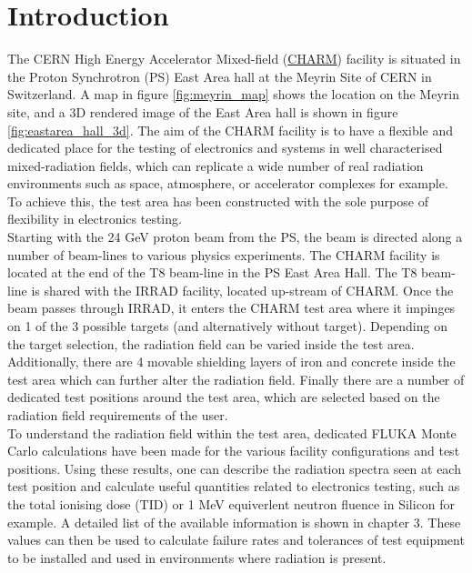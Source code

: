 \section{Introduction}

The CERN High Energy Accelerator Mixed-field (\href{http://charm.web.cern.ch/CHARM/}{CHARM}) facility is situated in the Proton Synchrotron (PS) East Area hall at the Meyrin Site of CERN in Switzerland. A map in figure \ref{fig:meyrin_map} shows the location on the Meyrin site, and a 3D rendered image of the East Area hall is shown in figure \ref{fig:eastarea_hall_3d}. The aim of the CHARM facility is to have a flexible and dedicated place for the testing of electronics and systems in well characterised mixed-radiation fields, which can replicate a wide number of real radiation environments such as space, atmosphere, or accelerator complexes for example. To achieve this, the test area has been constructed with the sole purpose of flexibility in electronics testing. \\

Starting with the 24 GeV proton beam from the PS, the beam is directed along a number of beam-lines to various physics experiments. The CHARM facility is located at the end of the T8 beam-line in the PS East Area Hall. The T8 beam-line is shared with the IRRAD facility, located up-stream of CHARM. Once the beam passes through IRRAD, it enters the CHARM test area where it impinges on 1 of the 3 possible targets (and alternatively without target). Depending on the target selection, the radiation field can be varied inside the test area. Additionally, there are 4 movable shielding layers of iron and concrete inside the test area which can further alter the radiation field. Finally there are a number of dedicated test positions around the test area, which are selected based on the radiation field requirements of the user. \\
 
To understand the radiation field within the test area, dedicated FLUKA \cite{FLUKA1} \cite{FLUKA2} Monte Carlo calculations have been made for the various facility configurations and test positions. Using these results, one can describe the radiation spectra seen at each test position and calculate useful quantities related to electronics testing, such as the total ionising dose (TID) or 1 MeV equiverlent neutron fluence in Silicon for example. A detailed list of the available information is shown in chapter 3. These values can then be used to calculate failure rates and tolerances of test equipment to be installed and used in environments where radiation is present. \\

